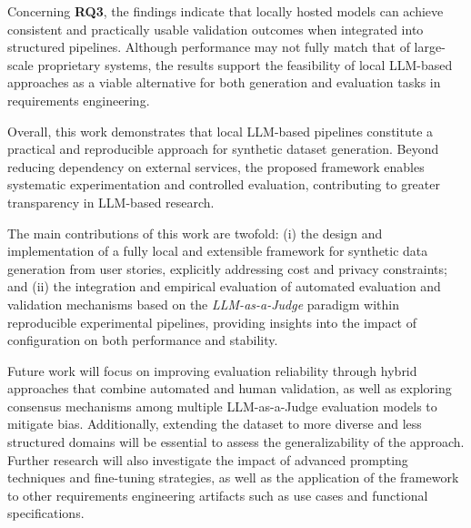 \documentclass[pdflatex,sn-mathphys-num]{sn-jnl}
\theoremstyle{thmstyleone}%
\theoremstyle{thmstyletwo}%
\theoremstyle{thmstylethree}%
\begin{document}
Concerning \textbf{RQ3}, the findings indicate that locally hosted models can achieve consistent and practically usable validation outcomes when integrated into structured pipelines. Although performance may not fully match that of large-scale proprietary systems, the results support the feasibility of local LLM-based approaches as a viable alternative for both generation and evaluation tasks in requirements engineering.

Overall, this work demonstrates that local LLM-based pipelines constitute a practical and reproducible approach for synthetic dataset generation. Beyond reducing dependency on external services, the proposed framework enables systematic experimentation and controlled evaluation, contributing to greater transparency in LLM-based research.

The main contributions of this work are twofold: (i) the design and implementation of a fully local and extensible framework for synthetic data generation from user stories, explicitly addressing cost and privacy constraints; and (ii) the integration and empirical evaluation of automated evaluation and validation mechanisms based on the \textit{LLM-as-a-Judge} paradigm within reproducible experimental pipelines, providing insights into the impact of configuration on both performance and stability.

Future work will focus on improving evaluation reliability through hybrid approaches that combine automated and human validation, as well as exploring consensus mechanisms among multiple LLM-as-a-Judge evaluation models to mitigate bias. Additionally, extending the dataset to more diverse and less structured domains will be essential to assess the generalizability of the approach. Further research will also investigate the impact of advanced prompting techniques and fine-tuning strategies, as well as the application of the framework to other requirements engineering artifacts such as use cases and functional specifications.

\backmatter
\end{document}
